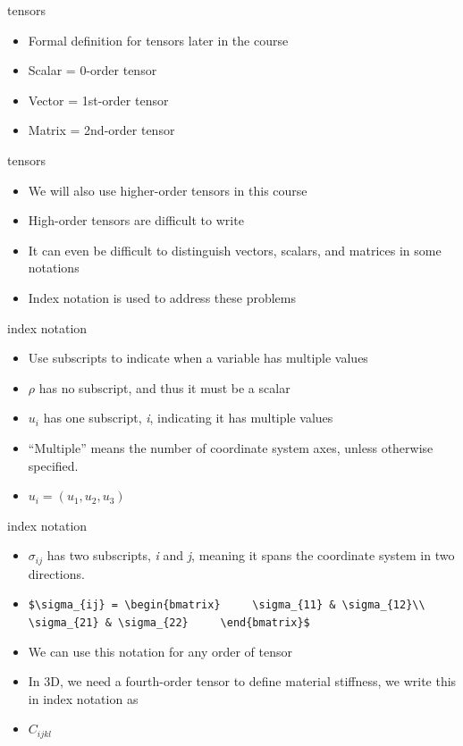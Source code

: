 \documentclass[
  letterpaper,
  ignorenonframetext,
  aspectratio=43,
  handout,
  12pt]{beamer}
\providecommand{\tightlist}{%
  \setlength{\itemsep}{0pt}\setlength{\parskip}{0pt}}
\providecommand{\tightlist}{%
\setlength{\itemsep}{0pt}\setlength{\parskip}{0pt}}
\begin{document}
\begin{frame}{tensors}
\protect\hypertarget{tensors}{}
\begin{itemize}
\tightlist
\item
  Formal definition for tensors later in the course
\item
  Scalar = 0-order tensor
\item
  Vector = 1st-order tensor
\item
  Matrix = 2nd-order tensor
\end{itemize}
\end{frame}

\begin{frame}{tensors}
\protect\hypertarget{tensors-1}{}
\begin{itemize}
\tightlist
\item
  We will also use higher-order tensors in this course
\item
  High-order tensors are difficult to write
\item
  It can even be difficult to distinguish vectors, scalars, and matrices
  in some notations
\item
  Index notation is used to address these problems
\end{itemize}
\end{frame}

\begin{frame}{index notation}
\protect\hypertarget{index-notation}{}
\begin{itemize}
\tightlist
\item
  Use subscripts to indicate when a variable has multiple values
\item
  \(\rho\) has no subscript, and thus it must be a scalar
\item
  \(u_i\) has one subscript, \emph{i}, indicating it has multiple values
\item
  ``Multiple'' means the number of coordinate system axes, unless
  otherwise specified.
\item
  \(u_i = (u_1, u_2, u_3)\)
\end{itemize}
\end{frame}

\begin{frame}[fragile]{index notation}
\protect\hypertarget{index-notation-1}{}
\begin{itemize}
\item
  \(\sigma_{ij}\) has two subscripts, \emph{i} and \emph{j}, meaning it
  spans the coordinate system in two directions.
\item
  \texttt{\$\textbackslash{}sigma\_\{ij\}\ =\ \textbackslash{}begin\{bmatrix\}\ \ \ \ \ \textbackslash{}sigma\_\{11\}\ \&\ \textbackslash{}sigma\_\{12\}\textbackslash{}\textbackslash{}\ \ \ \ \ \textbackslash{}sigma\_\{21\}\ \&\ \textbackslash{}sigma\_\{22\}\ \ \ \ \ \textbackslash{}end\{bmatrix\}\$}
\item
  We can use this notation for any order of tensor
\item
  In 3D, we need a fourth-order tensor to define material stiffness, we
  write this in index notation as
\item
  \(C_{ijkl}\)
\end{itemize}
\end{frame}
\end{document}

